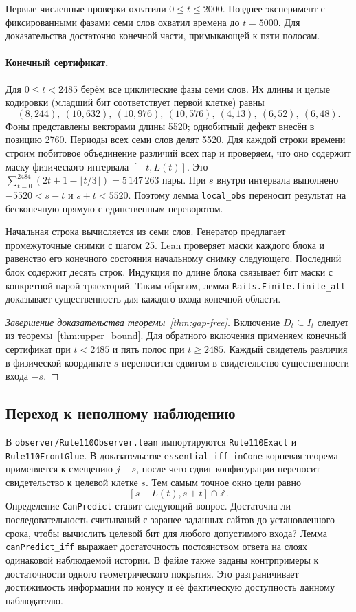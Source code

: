 Первые численные проверки охватили $0\le t\le2000$. Позднее эксперимент с фиксированными фазами семи слов охватил времена до $t=5000$. Для доказательства достаточно конечной части, примыкающей к пяти полосам.

\paragraph{Конечный сертификат.}
Для $0\le t<2485$ берём все циклические фазы семи слов. Их длины и целые кодировки (младший бит соответствует первой клетке) равны
\[
(8,244),\ (10,632),\ (10,976),\ (10,576),\ (4,13),\ (6,52),\ (6,48).
\]
Фоны представлены векторами длины 5520; однобитный дефект внесён в позицию 2760. Периоды всех семи слов делят 5520. Для каждой строки времени строим побитовое объединение различий всех пар и проверяем, что оно содержит маску физического интервала $[-t,L(t)]$. Это $\sum_{t=0}^{2484}(2t+1-\lfloor t/3\rfloor)=5\,147\,263$ пары. При $s$ внутри интервала выполнено $-5520<s-t$ и $s+t<5520$. Поэтому лемма \texttt{local\_obs} переносит результат на бесконечную прямую с единственным переворотом.

Начальная строка вычисляется из семи слов. Генератор предлагает промежуточные снимки с шагом 25. Lean проверяет маски каждого блока и равенство его конечного состояния начальному снимку следующего. Последний блок содержит десять строк. Индукция по длине блока связывает бит маски с конкретной парой траекторий. Таким образом, лемма \texttt{Rails.Finite.finite\_all} доказывает существенность для каждого входа конечной области.

\begin{proof}[Завершение доказательства теоремы~\ref{thm:gap-free}]
Включение $D_t\subseteq I_t$ следует из теоремы~\ref{thm:upper_bound}. Для обратного включения применяем конечный сертификат при $t<2485$ и пять полос при $t\ge2485$. Каждый свидетель различия в физической координате $s$ переносится сдвигом в свидетельство существенности входа $-s$.
\end{proof}

\subsection{Переход к неполному наблюдению}
В \texttt{observer/Rule110Observer.lean} импортируются \texttt{Rule110Exact} и \texttt{Rule110FrontGlue}. В доказательстве \texttt{essential\_iff\_inCone} корневая теорема применяется к смещению $j-s$, после чего сдвиг конфигурации переносит свидетельство к целевой клетке $s$. Тем самым точное окно цели равно
\[
  [s-L(t),s+t]\cap\mathbb Z.
\]
Определение \texttt{CanPredict} ставит следующий вопрос. Достаточна ли последовательность считываний с заранее заданных сайтов до установленного срока, чтобы вычислить целевой бит для любого допустимого входа? Лемма \texttt{canPredict\_iff} выражает достаточность постоянством ответа на слоях одинаковой наблюдаемой истории. В файле также заданы контрпримеры к достаточности одного геометрического покрытия. Это разграничивает достижимость информации по конусу и её фактическую доступность данному наблюдателю.

